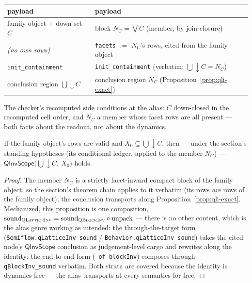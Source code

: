 \begin{brecipe}
\label{rec:qli-transport}
\begin{center}\small
\begin{tabular}{@{}ll@{}}
\textbf{{QLatticeInv} payload} & \textbf{{QBlockInv} payload}\\
\midrule
family object $+$ down-set $C$ & block $N_C = \bigvee C$ (member, by join-closure)\\
\emph{(no own rows)} & \texttt{facets} $:=$ $N_C$'s rows, cited from the family object\\
\texttt{init\_containment} & \texttt{init\_containment} (verbatim; $\bigcup\downarrow C = N_C$)\\
conclusion region $\bigcup\downarrow C$ & conclusion region $N_C$ (Proposition~\ref{prop:qli-exact})\\
\end{tabular}
\end{center}
The checker's recomputed side conditions at the alias: $C$ down-closed
in the recomputed cell order, and $N_C$ a member whose facet rows are
all present --- both facts about the readout, not about the dynamics.
\end{brecipe}

\begin{bprop}
\label{prop:qli-sound}
If the family object's rows are valid and
$X_0 \subseteq \bigcup\downarrow C$, then --- under the
 section's standing hypotheses (its conditional
ledger, applied to the member $N_C$) ---
$\mathsf{QInvScope}\big(\bigcup\downarrow C,\ X_0\big)$ holds.
\end{bprop}
\begin{proof}
The member $N_C$ is a strictly facet-inward compact block of the
family object, so the  section's theorem chain
applies to it verbatim (its rows \emph{are} rows of the family
object); the conclusion transports along
Proposition~\ref{prop:qli-exact}. Mechanized, this proposition is one
composition, $\mathrm{sound}_{\textsc{QLatticeInv}} =
\mathrm{sound}_{\textsc{QBlockInv}} \circ \mathrm{unpack}$ --- there
is no other content, which is the alias genre working as intended: the
through-the-target form (\texttt{Semiflow.qLatticeInv\_sound} /
\texttt{Behavior.qLatticeInv\_sound}) takes the cited node's
$\mathsf{QInvScope}$ conclusion as judgement-level cargo and rewrites
along the identity; the end-to-end form (\texttt{\_of\_blockInv})
composes through \texttt{qBlockInv\_sound} verbatim. Both strata are
covered because the identity is dynamics-free --- the alias transports
at every semantics for free.
\end{proof}

